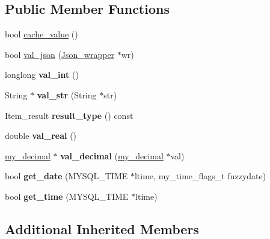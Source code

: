 \subsection*{Public Member Functions}
\begin{DoxyCompactItemize}
\item 
bool \mbox{\hyperlink{classItem__cache__json_ac43c5568d1d4b5cf928fe9b5445575fe}{cache\+\_\+value}} ()
\item 
bool \mbox{\hyperlink{classItem__cache__json_a6ca554ad2b7f1652594382f98698f4ba}{val\+\_\+json}} (\mbox{\hyperlink{classJson__wrapper}{Json\+\_\+wrapper}} $\ast$wr)
\item 
\mbox{\label{classItem__cache__json_a246619d220b9a2e854b772caf735dad8}} 
longlong {\bfseries val\+\_\+int} ()
\item 
\mbox{\label{classItem__cache__json_a42422de01925656c50a57f313d09b7c1}} 
String $\ast$ {\bfseries val\+\_\+str} (String $\ast$str)
\item 
\mbox{\label{classItem__cache__json_adde71b3d2a7fac7508b9fda3bc821673}} 
Item\+\_\+result {\bfseries result\+\_\+type} () const
\item 
\mbox{\label{classItem__cache__json_a8af8d9e9205afb1b31f2b6b79db8cbee}} 
double {\bfseries val\+\_\+real} ()
\item 
\mbox{\label{classItem__cache__json_af6150d9b27bc9901a40b0c7b4b15b833}} 
\mbox{\hyperlink{classmy__decimal}{my\+\_\+decimal}} $\ast$ {\bfseries val\+\_\+decimal} (\mbox{\hyperlink{classmy__decimal}{my\+\_\+decimal}} $\ast$val)
\item 
\mbox{\label{classItem__cache__json_a30075da5300d995ad8b867402a373f74}} 
bool {\bfseries get\+\_\+date} (M\+Y\+S\+Q\+L\+\_\+\+T\+I\+ME $\ast$ltime, my\+\_\+time\+\_\+flags\+\_\+t fuzzydate)
\item 
\mbox{\label{classItem__cache__json_a70c59a6aeaba48f9a6e67d6c1e2b906c}} 
bool {\bfseries get\+\_\+time} (M\+Y\+S\+Q\+L\+\_\+\+T\+I\+ME $\ast$ltime)
\end{DoxyCompactItemize}
\subsection*{Additional Inherited Members}


